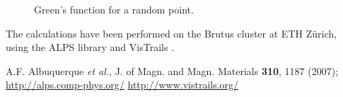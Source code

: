 \documentclass[prl, superscriptaddress, showpacs, twocolumn]{revtex4}
\begin{document}
\begin{figure}[h!]
\begin{center}
\vistrail[host=alps.ethz.ch,
db=vistrails,
vtid=3,
version=220,
tag=nice figure,
showspreadsheetonly]{}
\caption{Green's function for a random point.}
\label{green}
\end{center}
\end{figure}


\acknowledgments

The calculations have been performed on the Brutus  cluster at ETH Z{\"u}rich, using the ALPS library \cite{ALPS} and VisTrails  \cite{VisTrails} .

\begin{thebibliography}{9}
 A.F. Albuquerque {\it et al.}, J. of Magn. and Magn. Materials {\bf 310}, 1187 (2007); \url{http://alps.comp-phys.org/}
  \url{http://www.vistrails.org/}
\end{thebibliography}
\end{document}
